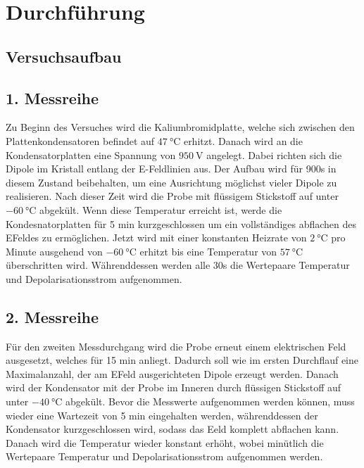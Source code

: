 \section{Durchführung}
\label{sec:Durchführung}

\subsection{Versuchsaufbau}


\subsection{1. Messreihe}

Zu Beginn des Versuches wird die Kaliumbromidplatte, welche sich zwischen den 
Plattenkondensatoren befindet auf $\SI{47}{\celsius}$ erhitzt.
Danach wird an die Kondensatorplatten eine Spannung von $\SI{950}{\volt}$ angelegt. 
Dabei richten sich die Dipole im Kristall entlang der E-Feldlinien aus.
Der Aufbau wird für 900s in diesem Zustand beibehalten, um eine 
Ausrichtung möglichst vieler Dipole zu realisieren.
Nach dieser Zeit wird die Probe mit flüssigem Stickstoff auf unter $\SI{-60}{\celsius}$ abgekült.
Wenn diese Temperatur erreicht ist, werde die Kondesnatorplatten für 5 min kurzgeschlossen
um ein vollständiges abflachen des EFeldes zu ermöglichen.
Jetzt wird mit einer konstanten Heizrate von $\SI{2}{\celsius}$ pro Minute ausgehend von 
$\SI{-60}{\celsius}$ erhitzt bis eine Temperatur von $\SI{57}{\celsius}$ überschritten wird. 
Währenddessen werden alle 30s die Wertepaare Temperatur und Depolarisationsstrom 
aufgenommen.


\subsection{2. Messreihe}

Für den zweiten Messdurchgang wird die Probe erneut einem elektrischen Feld ausgesetzt,
welches für 15 min anliegt. Dadurch soll wie im ersten Durchflauf eine Maximalanzahl,
der am EFeld ausgerichteten Dipole erzeugt werden.
Danach wird der Kondensator mit der Probe im Inneren durch flüssigen Stickstoff auf 
unter $\SI{-40}{\celsius}$ abgekült. Bevor die Messwerte aufgenommen werden können, muss wieder 
eine Wartezeit von 5 min eingehalten werden, währenddessen der Kondensator 
kurzgeschlossen wird, sodass das Eeld komplett abflachen kann.
Danach wird die Temperatur wieder konstant erhöht, wobei minütlich die Wertepaare
Temperatur und Depolarisationsstrom aufgenommen werden.

\cite{sample}